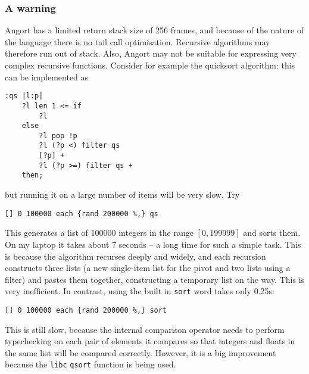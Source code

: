 \subsubsection{A warning}
Angort has a limited return stack size of 256 frames, and because of the nature
of the language there is no tail call optimisation. Recursive algorithms
may therefore run out of stack. Also, Angort may not be suitable for expressing
very complex recursive functions. Consider for example the quicksort algorithm:
this can be implemented as
\begin{lstlisting}
:qs |l:p| 
    ?l len 1 <= if 
        ?l 
    else 
        ?l pop !p 
        ?l (?p <) filter qs 
        [?p] + 
        ?l (?p >=) filter qs + 
    then;
\end{lstlisting}
but running it on a large number of items will be very slow. Try
\begin{lstlisting}
[] 0 100000 each {rand 200000 %,} qs
\end{lstlisting}
This generates a list of 100000 integers in the range $[0,199999]$ and
sorts them. On my laptop it takes about 7 seconds -- a long time for
such a simple task.
This is because the algorithm recurses deeply and widely,
and each recursion constructs 
three lists (a new single-item list for the pivot and two lists
using a filter) and pastes them together, constructing a temporary 
list on the way. This is very inefficient.
In contrast, using the built in \texttt{sort} word takes only 0.25s:
\begin{lstlisting}
[] 0 100000 each {rand 200000 %,} sort
\end{lstlisting}
This is still slow, because the internal comparison operator
needs to perform typechecking on each pair of elements it compares
so that integers and floats in the same list will be compared
correctly. However, it is a big improvement because the \texttt{libc} 
\texttt{qsort} function is being used.


